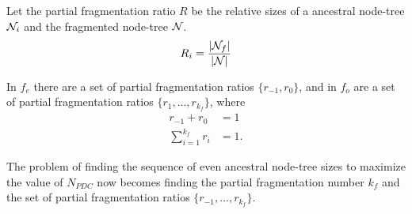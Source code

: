 \begin{definition}\label{lem:fragratio}
  Let the partial fragmentation ratio $R$ be the relative sizes of a ancestral node-tree $\mathcal{N}_i$ and the fragmented node-tree $\mathcal{N}$.
  \begin{equation}\label{eq:fragratio}
    R_i = \frac{\abs{\mathcal{N}_f}}{\abs{\mathcal{N}}}
  \end{equation}
\end{definition}
In $f_e$ there are a set of partial fragmentation ratios $\{r_{-1}, r_0\}$, and in $f_o$ are a set of partial fragmentation ratios $\{r_1,...,r_{k_f}\}$, where
\begin{align}
  r_{-1} +  r_0 &= 1 \\
 \sum_{i=1}^{k_f}{r_i} &= 1. 
\end{align}

The problem of finding the sequence of even ancestral node-tree sizes to maximize the value of $N_{PDC}$ now becomes finding the partial fragmentation number $k_f$ and the set of partial fragmentation ratios $\{r_{-1},..., r_{k_f}\}$.  

